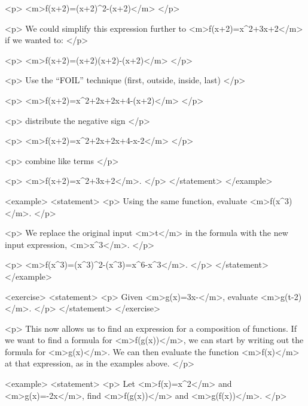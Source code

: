                 <p>
                    <m>f(x+2)=(x+2)^{2}-(x+2)</m>
                </p>

                <p>
                    We could simplify this expression further to <m>f(x+2)=x^{2}+3x+2</m> if we wanted to:
                </p>

                <p>
                    <m>f(x+2)=(x+2)(x+2)-(x+2)</m>
                </p>

                <p>
                    Use the “FOIL” technique (first, outside, inside, last)
                </p>

                <p>
                    <m>f(x+2)=x^{2}+2x+2x+4-(x+2)</m>
                </p>

                <p>
                    distribute the negative sign
                </p>

                <p>
                    <m>f(x+2)=x^{2}+2x+2x+4-x-2</m>
                </p>

                <p>
                    combine like terms
                </p>

                <p>
                    <m>f(x+2)=x^{2}+3x+2</m>.
                </p>
            </statement>
        </example>

        <example>
            <statement>
                <p>
                    Using the same function, evaluate <m>f(x^{3})</m>.
                </p>

                <p>
                    We replace the original input <m>t</m> in the formula with the new input expression, <m>x^{3}</m>.
                </p>

                <p>
                    <m>f(x^{3})=(x^{3})^{2}-(x^{3})=x^{6}-x^{3}</m>.
                </p>
            </statement>
        </example>

        <exercise>
            <statement>
                <p>
                    Given <m>g(x)=3x-</m>, evaluate <m>g(t-2)</m>.
                </p>
            </statement>
        </exercise>

        <p>
            This now allows us to find an expression for a composition of functions.
            If we want to find a formula for <m>f(g(x))</m>, we can start by writing out the formula for <m>g(x)</m>.
            We can then evaluate the function <m>f(x)</m> at that expression, as in the examples above.
        </p>

        <example>
            <statement>
                <p>
                    Let <m>f(x)=x^{2}</m> and <m>g(x)=-2x</m>, find <m>f(g(x))</m> and <m>g(f(x))</m>.
                </p>

